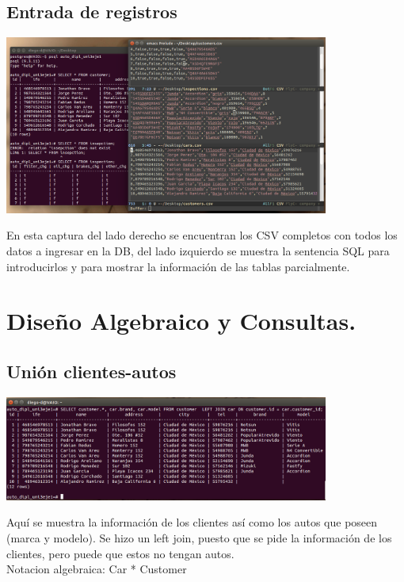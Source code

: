 \documentclass[spanish,12pt,letterpapper]{article}
\begin{document}
	\subsection{Entrada de registros}
	\begin{center}
	\includegraphics[width=0.8\textwidth]{./images/f}~\\[1cm]
	\end{center}
	En esta captura del lado derecho se encuentran los CSV completos con todos los datos a ingresar en la DB, del lado izquierdo se muestra la sentencia SQL para introducirlos y para mostrar la información de las tablas parcialmente.
	
	\section{Diseño Algebraico y Consultas.}
	
	\subsection{Unión clientes-autos}
	\begin{center}
	\includegraphics[width=0.8\textwidth]{./images/g}~\\[1cm]
	\end{center}
	Aquí se muestra la información de los clientes así como los autos que poseen (marca y modelo). Se hizo un left join, puesto que se pide la información de los clientes, pero puede que estos no tengan autos.\\
	
	Notacion algebraica: Car * Customer
	
\end{document}
